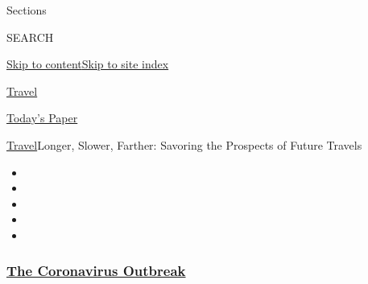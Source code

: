 Sections

SEARCH

\protect\hyperlink{site-content}{Skip to
content}\protect\hyperlink{site-index}{Skip to site index}

\href{https://www.nytimes3xbfgragh.onion/section/travel}{Travel}

\href{https://myaccount.nytimes3xbfgragh.onion/auth/login?response_type=cookie\&client_id=vi}{}

\href{https://www.nytimes3xbfgragh.onion/section/todayspaper}{Today's
Paper}

\href{/section/travel}{Travel}\textbar{}Longer, Slower, Farther:
Savoring the Prospects of Future Travels

\begin{itemize}
\item
\item
\item
\item
\item
\end{itemize}

\hypertarget{the-coronavirus-outbreak}{%
\subsubsection{\texorpdfstring{\href{https://www.nytimes3xbfgragh.onion/news-event/coronavirus?name=styln-coronavirus-national\&region=TOP_BANNER\&block=storyline_menu_recirc\&action=click\&pgtype=Article\&impression_id=9bf8aba0-f1c8-11ea-9737-fd0679c2a2e5\&variant=undefined}{The
Coronavirus
Outbreak}}{The Coronavirus Outbreak}}\label{the-coronavirus-outbreak}}

